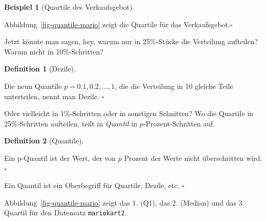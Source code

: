 \documentclass[
  letterpaper,
]{scrbook}
\theoremstyle{definition}
\newtheorem{example}{Beispiel}[chapter]
\theoremstyle{definition}
\newtheorem{definition}{Definition}[chapter]
\theoremstyle{definition}
\theoremstyle{remark}
\begin{document}
\begin{example}[Quartile des
Verkaufsgebot]\protect\hypertarget{exm-mario-qs}{}\label{exm-mario-qs}

Abbildung~\ref{fig-quantile-mario} zeigt die Quartile für das
Verkaufsgebot.\(\square\)

\end{example}

Jetzt könnte man sagen, hey, warum nur in 25\%-Stücke die Verteilung
aufteilen? Warum nicht in 10\%-Schritten?

\begin{definition}[Dezile]\protect\hypertarget{def-dezile}{}\label{def-dezile}

Die neun Quantile \(p= 0.1, 0.2, \ldots, 1\), die die Verteilung in 10
gleiche Teile unterteilen, nennt man Dezile. \(\square\)

\end{definition}

Oder vielleicht in 1\%-Schritten oder in sonstigen Schnitten? Wo die
Quartile in 25\%-Schritten aufteilen, teilt in \emph{Quantil} in
\(p\)-Prozent-Schritten auf.

\begin{definition}[Quantile]\protect\hypertarget{def-quantile}{}\label{def-quantile}

Ein p-Quantil ist der Wert, der von \(p\) Prozent der Werte nicht
überschritten wird.\(\square\)

\end{definition}

\begin{tcolorbox}[enhanced jigsaw, left=2mm, toptitle=1mm, toprule=.15mm, rightrule=.15mm, leftrule=.75mm, breakable, colbacktitle=quarto-callout-note-color!10!white, colback=white, coltitle=black, bottomtitle=1mm, opacityback=0, title=\textcolor{quarto-callout-note-color}{\faInfo}\hspace{0.5em}{Hinweis}, colframe=quarto-callout-note-color-frame, arc=.35mm, opacitybacktitle=0.6, bottomrule=.15mm, titlerule=0mm]

Ein Quantil ist ein Oberbegriff für Quartile, Dezile, etc. \(\square\)

\end{tcolorbox}

Abbildung~\ref{fig-quantile-mario} zeigt das 1. (Q1), das 2. (Median)
und das 3. Quartil für den Datensatz \texttt{mariokart2}.
\end{document}
